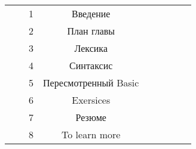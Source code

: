 \documentclass{book}
\begin{document}
\begin{table}[hс]
\begin{center}
\begin{tabular}{|c|c|c|c|c|c|c|c|c|}
	\cline{3-9}
	 & & 1 & Введение & \yes & \yes & \yes & \yes & \no \\
	\cline{3-9}
	 &  & 2 & План главы & \yes & \yes & \yes & \yes & \no \\
	\cline{3-9}
	 &  & 3 & Лексика & \yes & \yes & \yes & \no & \no \\
	\cline{3-9}
	 &  & 4 & Синтаксис & \yes & \yes & \no & \no & \no \\
	\cline{3-9}
	 &  & 5 & Пересмотренный Basic & \yes & \yes & \no & \no & \no \\
	\cline{3-9}
	 &  & 6 & Exersices & \no & \no & \no & \no & \no \\
	\cline{3-9}
	 &  & 7 & Резюме & \yes & \yes & \no & \no & \no \\
	\cline{3-9}
	 &  & 8 & To learn more & \no & \no & \no & \no & \no \\
	\hline
\end{tabular}

\end{center}
\end{table}
\end{document}
